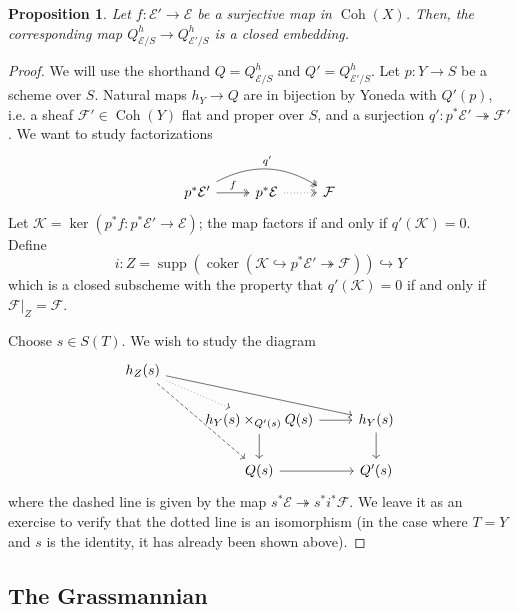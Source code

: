 \documentclass[10pt]{article}
\newtheorem{prop}[thm]{Proposition}
\theoremstyle{definition}
\DeclareMathOperator{\supp}{supp}
\DeclareMathOperator{\Coh}{Coh}
\DeclareMathOperator{\coker}{coker}
\begin{document}
\begin{prop}
Let $f: \mathcal{E}' \rightarrow \mathcal{E}$ be a surjective map in $\Coh(X)$.  Then, the corresponding map $Q^h_{\mathcal{E}/S} \rightarrow Q^h_{\mathcal{E}'/S}$ is a closed embedding.
\end{prop}
\begin{proof}
We will use the shorthand $Q = Q^h_{\mathcal{E}/S}$ and $Q' = Q^h_{\mathcal{E}'/S}$.  Let $p: Y \rightarrow S$ be a scheme over $S$.  Natural maps $h_Y \rightarrow Q$ are in bijection by Yoneda with $Q'(p)$, i.e. a sheaf $\mathcal{F}' \in \Coh(Y)$ flat and proper over $S$, and a surjection $q': p^* \mathcal{E}' \twoheadrightarrow \mathcal{F}'$.   We want to study factorizations
$$\begin{tikzcd}
p^* \mathcal{E}' \arrow[r, "f", two heads] \arrow[rr, bend left, "q'", two heads] & p^*\mathcal{E} \arrow[r, dotted, two heads] & \mathcal{F}
\end{tikzcd}$$
Let $\mathcal{K} = \ker(p^* f: p^* \mathcal{E}' \rightarrow \mathcal{E})$; the map factors if and only if $q'(\mathcal{K}) = 0$.  Define 
$$i: Z = \supp(\coker(\mathcal{K} \hookrightarrow p^*\mathcal{E}' \twoheadrightarrow \mathcal{F})) \hookrightarrow Y$$
which is a closed subscheme with the property that $q'(\mathcal{K}) = 0$ if and only if $\mathcal{F}|_Z = \mathcal{F}$.

Choose $s \in S(T)$.  We wish to study the diagram
$$\begin{tikzcd}
h_Z(s) \arrow[dr, dotted] \arrow[drr] \arrow[ddr, dashed]& & \\
& h_Y(s) \times_{Q'(s)} Q(s) \arrow[d] \arrow[r] & h_Y(s) \arrow[d] \\
& Q(s) \arrow[r] & Q'(s)
\end{tikzcd}$$
where the dashed line is given by the map $s^*\mathcal{E} \twoheadrightarrow s^*i^*\mathcal{F}$.  We leave it as an exercise to verify that the dotted line is an isomorphism (in the case where $T = Y$ and $s$ is the identity, it has already been shown above).
\end{proof}


\subsection{The Grassmannian}
\end{document}
